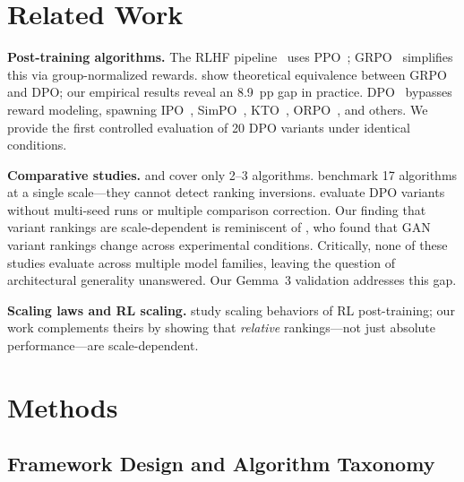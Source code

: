 \documentclass{article}
\begin{document}
\section{Related Work}

\textbf{Post-training algorithms.}
The RLHF pipeline~\citep{ouyang2022training} uses PPO~\citep{schulman2017proximal}; GRPO~\citep{shao2024deepseekmath} simplifies this via group-normalized rewards.
\citet{wu2025grpo_dpo} show theoretical equivalence between GRPO and DPO; our empirical results reveal an 8.9~pp gap in practice.
DPO~\citep{rafailov2023direct} bypasses reward modeling, spawning IPO~\citep{azar2024general}, SimPO~\citep{meng2024simpo}, KTO~\citep{ethayarajh2024kto}, ORPO~\citep{hong2024orpo}, and others.
We provide the first controlled evaluation of 20 DPO variants under identical conditions.

\textbf{Comparative studies.}
\citet{xu2024dpo} and \citet{ivison2024unpacking} cover only 2--3 algorithms.
\citet{spangher2025rlhf} benchmark 17 algorithms at a single scale---they cannot detect ranking inversions.
\citet{saeidi2025dpo_variants} evaluate DPO variants without multi-seed runs or multiple comparison correction.
Our finding that variant rankings are scale-dependent is reminiscent of \citet{lucic2018gans}, who found that GAN variant rankings change across experimental conditions.
Critically, none of these studies evaluate across multiple model families, leaving the question of architectural generality unanswered. Our Gemma~3 validation addresses this gap.

\textbf{Scaling laws and RL scaling.}
\citet{tan2025rl_scaling} study scaling behaviors of RL post-training; our work complements theirs by showing that \emph{relative} rankings---not just absolute performance---are scale-dependent.

\section{Methods}
\label{sec:methods}

\subsection{Framework Design and Algorithm Taxonomy}
\label{sec:framework}
\end{document}
